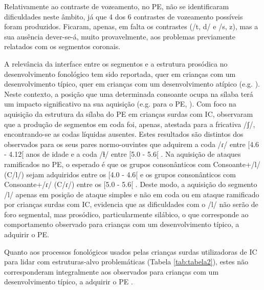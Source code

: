 \documentclass[output=paper,colorlinks,citecolor=brown,booklanguage=portuguese]{langscibook}
\begin{document}
Relativamente ao contraste de vozeamento, no PE, não se identificaram dificuldades neste âmbito, já que 4 dos 6 contrastes de vozeamento possíveis foram produzidos. Ficaram, apenas, em falta os contrastes (/t, d/ e /s, z), mas a sua ausência dever-se-á, muito provavelmente, aos problemas previamente relatados com os segmentos coronais.

A relevância da interface entre os segmentos e a estrutura prosódica no desenvolvimento fonológico tem sido reportada, quer em crianças com um desenvolvimento típico, quer em crianças com um desenvolvimento atípico (e.g. \citealp{Demuth2014, Fikkert1994, Freitas1997, Marshall2009, Marshall2015}). Neste contexto, a posição que uma determinada consoante ocupa na sílaba terá um impacto significativo na sua aquisição (e.g. para o PE, \citealp{Amorim2014, Freitas1997, Mendes2013, Ramalho2017}). Com foco na aquisição da estrutura da sílaba do PE em crianças surdas com IC, \citet{Lynce2019} observaram que a produção de segmentos em coda foi, apenas, atestada para a fricativa /ʃ/, encontrando-se as codas líquidas ausentes. Estes resultados são distintos dos observados para os seus pares normo-ouvintes que adquirem a coda /ɾ/ entre [4.6 - 4.12[ anos de idade e a coda /ɫ/ entre [5.0 - 5.6[ \citep{Mendes2013}. Na aquisição de ataques ramificados no PE, o esperado é que os grupos consonânticos com Consoante+/l/ (C/l/) sejam adquiridos entre os [4.0 - 4.6[ e os grupos consonânticos com Consoante+/ɾ/ (C/ɾ/) entre os [5.0 - 5.6[ \citep{Mendes2013}.  Deste modo, a aquisição do segmento /l/ apenas em posição de ataque simples e não em coda ou em ataque ramificado por crianças surdas com IC, evidencia que as dificuldades com o /l/ não serão de foro segmental, mas prosódico, particularmente silábico, o que corresponde ao comportamento observado para crianças com um desenvolvimento típico, a adquirir o PE. 

Quanto aos processos fonológicos usados pelas crianças surdas utilizadoras de IC para lidar com estruturas-alvo problemáticas (Tabela \ref{tab:tabela2}), estes não corresponderam integralmente aos observados para crianças com um desenvolvimento típico, a adquirir o PE \citep{Mendes2013}.
\end{document}
